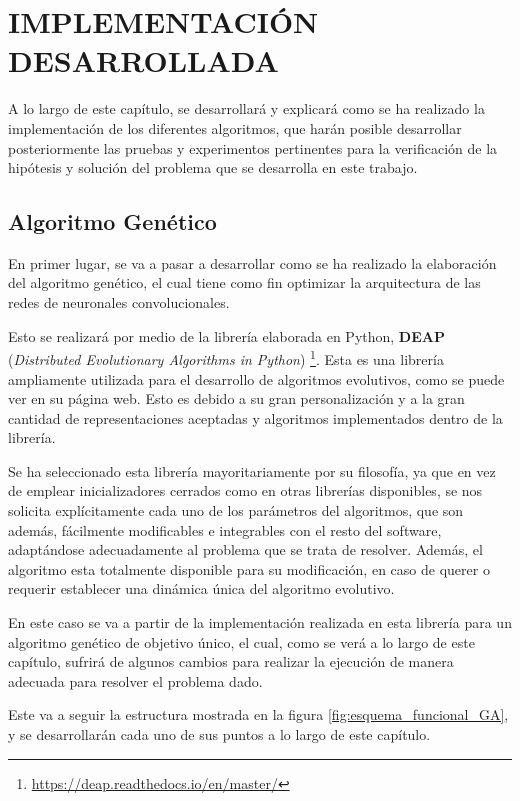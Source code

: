 %
\chapter{IMPLEMENTACIÓN DESARROLLADA}
\label{sec:implementación}

A lo largo de este capítulo, se desarrollará y explicará como se ha realizado la implementación de los diferentes algoritmos, que harán posible desarrollar posteriormente las pruebas y experimentos pertinentes para la verificación de la hipótesis y solución del problema que se desarrolla en este trabajo.

\section{Algoritmo Genético}

En primer lugar, se va a pasar a desarrollar como se ha realizado la elaboración del algoritmo genético, el cual tiene como fin optimizar la arquitectura de las redes de neuronales convolucionales.

Esto se realizará por medio de la librería elaborada en Python, \textbf{DEAP} (\textit{Distributed Evolutionary Algorithms in Python}) \footnote{\url{https://deap.readthedocs.io/en/master/}}. Esta es una librería ampliamente utilizada para el desarrollo de algoritmos evolutivos, como se puede ver en su página web. Esto es debido a su gran personalización y a la gran cantidad de representaciones aceptadas y algoritmos implementados dentro de la librería.

Se ha seleccionado esta librería mayoritariamente por su filosofía, ya que en vez de emplear inicializadores cerrados como en otras librerías disponibles, se nos solicita explícitamente cada uno de los parámetros del algoritmos, que son además, fácilmente modificables e integrables con el resto del software, adaptándose adecuadamente al problema que se trata de resolver. Además, el algoritmo esta totalmente disponible para su modificación, en caso de querer o requerir establecer una dinámica única del algoritmo evolutivo.

En este caso se va a partir de la implementación realizada en esta librería para un algoritmo genético de objetivo único, el cual, como se verá a lo largo de este capítulo, sufrirá de algunos cambios para realizar la ejecución de manera adecuada para resolver el problema dado.

Este va a seguir la estructura mostrada en la figura \ref{fig:esquema_funcional_GA}, y se desarrollarán cada uno de sus puntos a lo largo de este capítulo.\\

